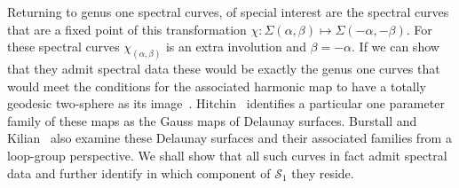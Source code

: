 \documentclass{article}
\begin{document}

Returning to genus one spectral curves, of special interest are the spectral curves that are a fixed point of this transformation $\chi: \Sigma(\alpha,\beta) \mapsto \Sigma(-\alpha,-\beta)$. For these spectral curves $\chi_{(\alpha,\beta)}$ is an extra involution and $\beta=-\alpha$. If we can show that they admit spectral data these would be exactly the genus one curves that would meet the conditions for the associated harmonic map to have a totally geodesic two-sphere as its image~\cite[Theorem~8.20]{Hitchin1990}. Hitchin~\cite[p693]{Hitchin1990} identifies a particular one parameter family of these maps as the Gauss maps of Delaunay surfaces. Burstall and Kilian~\cite{Burstall2006} also examine these Delaunay surfaces and their associated families from a loop-group perspective. We shall show that all such curves in fact admit spectral data and further identify in which component of $\mathcal{S}_1$ they reside.
\end{document}

